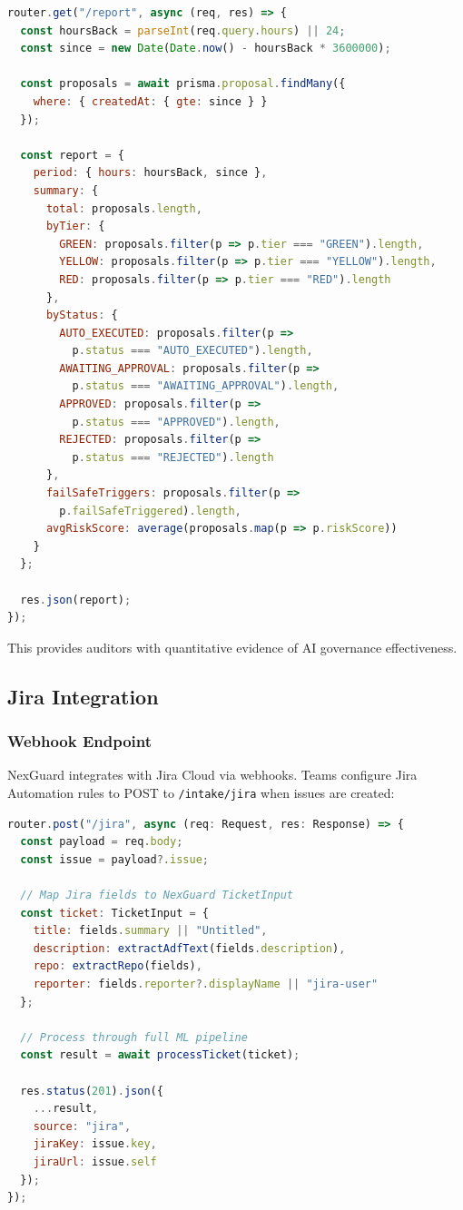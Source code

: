 \documentclass[11pt,a4paper]{article}
\begin{document}
\begin{lstlisting}[language=JavaScript,caption=Compliance Report]
router.get("/report", async (req, res) => {
  const hoursBack = parseInt(req.query.hours) || 24;
  const since = new Date(Date.now() - hoursBack * 3600000);
  
  const proposals = await prisma.proposal.findMany({
    where: { createdAt: { gte: since } }
  });
  
  const report = {
    period: { hours: hoursBack, since },
    summary: {
      total: proposals.length,
      byTier: {
        GREEN: proposals.filter(p => p.tier === "GREEN").length,
        YELLOW: proposals.filter(p => p.tier === "YELLOW").length,
        RED: proposals.filter(p => p.tier === "RED").length
      },
      byStatus: {
        AUTO_EXECUTED: proposals.filter(p => 
          p.status === "AUTO_EXECUTED").length,
        AWAITING_APPROVAL: proposals.filter(p => 
          p.status === "AWAITING_APPROVAL").length,
        APPROVED: proposals.filter(p => 
          p.status === "APPROVED").length,
        REJECTED: proposals.filter(p => 
          p.status === "REJECTED").length
      },
      failSafeTriggers: proposals.filter(p => 
        p.failSafeTriggered).length,
      avgRiskScore: average(proposals.map(p => p.riskScore))
    }
  };
  
  res.json(report);
});
\end{lstlisting}

This provides auditors with quantitative evidence of AI governance effectiveness.

\newpage
\subsection{Jira Integration}

\subsubsection{Webhook Endpoint}
NexGuard integrates with Jira Cloud via webhooks. Teams configure Jira Automation rules to POST to \texttt{/intake/jira} when issues are created:

\begin{lstlisting}[language=JavaScript,caption=Jira Webhook Handler (intake.ts)]
router.post("/jira", async (req: Request, res: Response) => {
  const payload = req.body;
  const issue = payload?.issue;
  
  // Map Jira fields to NexGuard TicketInput
  const ticket: TicketInput = {
    title: fields.summary || "Untitled",
    description: extractAdfText(fields.description),
    repo: extractRepo(fields),
    reporter: fields.reporter?.displayName || "jira-user"
  };
  
  // Process through full ML pipeline
  const result = await processTicket(ticket);
  
  res.status(201).json({
    ...result,
    source: "jira",
    jiraKey: issue.key,
    jiraUrl: issue.self
  });
});
\end{lstlisting}
\end{document}
